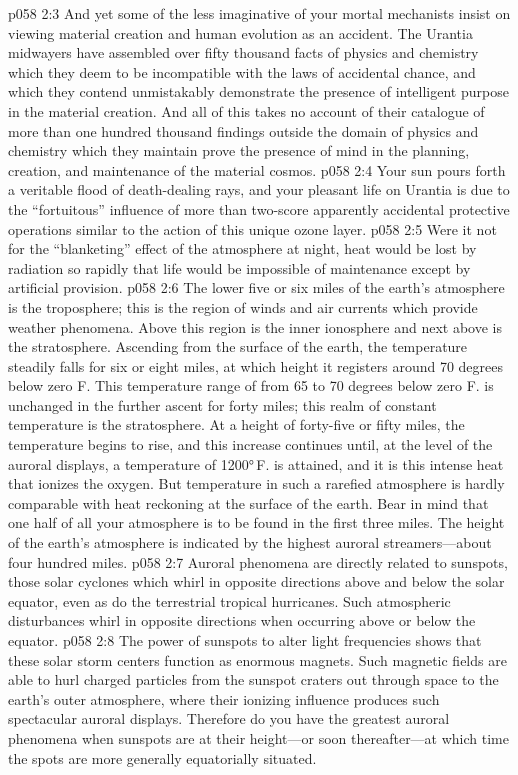 \vs p058 2:3 And yet some of the less imaginative of your mortal mechanists insist on viewing material creation and human evolution as an accident. The Urantia midwayers have assembled over fifty thousand facts of physics and chemistry which they deem to be incompatible with the laws of accidental chance, and which they contend unmistakably demonstrate the presence of intelligent purpose in the material creation. And all of this takes no account of their catalogue of more than one hundred thousand findings outside the domain of physics and chemistry which they maintain prove the presence of mind in the planning, creation, and maintenance of the material cosmos.
\vs p058 2:4 Your sun pours forth a veritable flood of death\hyp{}dealing rays, and your pleasant life on Urantia is due to the “fortuitous” influence of more than two\hyp{}score apparently accidental protective operations similar to the action of this unique ozone layer.
\vs p058 2:5 Were it not for the “blanketing” effect of the atmosphere at night, heat would be lost by radiation so rapidly that life would be impossible of maintenance except by artificial provision.
\pc \vs p058 2:6 The lower five or six miles of the earth’s atmosphere is the troposphere; this is the region of winds and air currents which provide weather phenomena. Above this region is the inner ionosphere and next above is the stratosphere. Ascending from the surface of the earth, the temperature steadily falls for six or eight miles, at which height it registers around 70 degrees below zero F. This temperature range of from 65 to 70 degrees below zero F. is unchanged in the further ascent for forty miles; this realm of constant temperature is the stratosphere. At a height of forty\hyp{}five or fifty miles, the temperature begins to rise, and this increase continues until, at the level of the auroral displays, a temperature of 1200°\,F. is attained, and it is this intense heat that ionizes the oxygen. But temperature in such a rarefied atmosphere is hardly comparable with heat reckoning at the surface of the earth. Bear in mind that one half of all your atmosphere is to be found in the first three miles. The height of the earth’s atmosphere is indicated by the highest auroral streamers---about four hundred miles.
\vs p058 2:7 Auroral phenomena are directly related to sunspots, those solar cyclones which whirl in opposite directions above and below the solar equator, even as do the terrestrial tropical hurricanes. Such atmospheric disturbances whirl in opposite directions when occurring above or below the equator.
\vs p058 2:8 The power of sunspots to alter light frequencies shows that these solar storm centers function as enormous magnets. Such magnetic fields are able to hurl charged particles from the sunspot craters out through space to the earth’s outer atmosphere, where their ionizing influence produces such spectacular auroral displays. Therefore do you have the greatest auroral phenomena when sunspots are at their height---or soon thereafter---at which time the spots are more generally equatorially situated.
